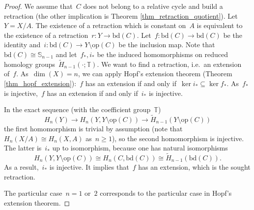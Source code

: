 \documentclass[english,11pt]{article}
\theoremstyle{plain}
\theoremstyle{remark}
\theoremstyle{definition}
\newcommand{\bd}[1]{\mathrm{bd}(#1)}
\newcommand{\op}[1]{\mathrm{op}(#1)}
\newcommand{\Sp}{\mathbb{S}}
\newcommand{\R}{\mathbb{R}}
\newcommand{\Z}{\mathbb{Z}}
\newcommand{\RZ}{\mathbb{T}}%
\begin{document}
\begin{proof}
We assume that~$C$ does not belong to a relative cycle and build a retraction (the other implication is Theorem \ref{thm_retraction_quotient}). Let~$Y=X/A$. The existence of a retraction which is constant on~$A$ is equivalent to the existence of a retraction~$r:Y\to\bd{C}$. Let~$f:\bd{C}\to\bd{C}$ be the identity and~$i:\bd{C}\to Y\setminus \op{C}$ be the inclusion map. Note that~$\bd{C}\cong \Sp_{n-1}$ and let~$f_*,i_*$ be the induced homomorphisms on reduced homology groups~$\widetilde{H}_{n-1}(\cdot;\RZ)$. We want to find a retraction, i.e.~an extension of~$f$. As~$\dim(X)=n$, we can apply Hopf's extension theorem (Theorem \ref{thm_hopf_extension}):~$f$ has an extension if and only if~$\ker i_*\subseteq \ker f_*$. As~$f_*$ is injective,~$f$ has an extension if and only if~$i_*$ is injective.

In the exact sequence (with the coefficient group~$\RZ$)
\begin{equation}\label{eq10}
H_n(Y)\to H_n(Y,Y\setminus \op{C})\to \widetilde{H}_{n-1}(Y\setminus \op{C})
\end{equation}
the first homomorphism is trivial by assumption (note that~$H_n(X/A)\cong H_n(X,A)$ as~$n\geq 1$), so the second homomorphism is injective. The latter is~$i_*$ up to isomorphism, because one has natural isomorphisms
\begin{equation*}
H_n(Y,Y\setminus \op{C})\cong H_n(C,\bd{C})\cong \widetilde{H}_{n-1}(\bd{C}).
\end{equation*}
As a result,~$i_*$ is injective. It implies that~$f$ has an extension, which is the sought retraction.

The particular case~$n=1$ or~$2$ corresponds to the particular case in Hopf's extension theorem.
\end{proof}
\end{document}
